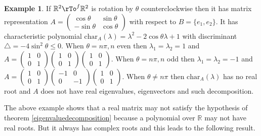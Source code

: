\documentclass[12pt]{amsart}
\theoremstyle{definition}
\newtheorem{example}[theorem]{Example}
\begin{document}
\begin{example}\label{eigenvalues3} If $\mathbb{R}^2 \rTo^f \mathbb{R}^2$ is rotation by $\theta$ counterclockwise then it has matrix representation $A = \left(\begin{array}{cc} \cos \theta & \sin \theta \\ - \sin \theta & \cos \theta \end{array}\right)$ with respect to $B = \{e_1, e_2\}$. It has characteristic polynomial $\text{char}_A(\lambda) = \lambda^2 - 2 \cos \theta \lambda + 1$ with discriminant $\bigtriangleup = - 4 \sin^2 \theta \leq 0$. When $\theta = n \pi, n$ even then $\lambda_1 = \lambda_2 = 1$ and $A = \left(\begin{array}{cc} 1 & 0 \\ 0 & 1 \end{array}\right)\left(\begin{array}{cc} 1 & 0 \\ 0 & 1 \end{array}\right)\left(\begin{array}{cc} 1 & 0 \\ 0 & 1 \end{array}\right)$. When $\theta = n \pi, n$ odd then $\lambda_1 = \lambda_2 = -1$ and $A = \left(\begin{array}{cc} 1 & 0 \\ 0 & 1 \end{array}\right)\left(\begin{array}{cc} -1 & 0 \\ 0 & -1 \end{array}\right)\left(\begin{array}{cc} 1 & 0 \\ 0 & 1 \end{array}\right)$. When $\theta \neq n \pi$ then $\text{char}_A(\lambda)$ has no real root and $A$ does not have real eigenvalues, eigenvectors and such decomposition.
\end{example}

The above example shows that a real matrix may not satisfy the hypothesis of theorem \ref{eigenvaluedecomposition} because a polynomial over $\mathbb{R}$ may not have real roots. But it always has complex roots and this leads to the following result.
\end{document}
